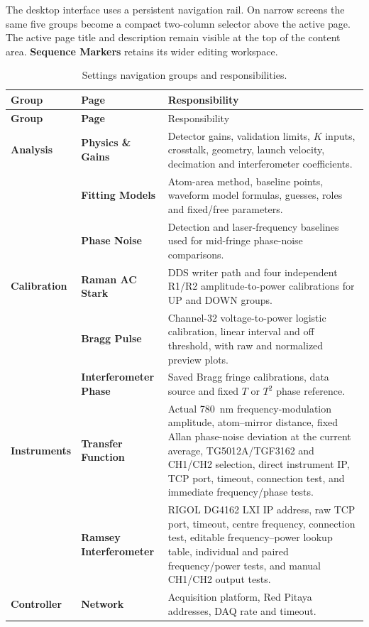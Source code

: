 \documentclass[11pt,oneside,openany]{book}
\newcommand{\ui}[1]{\textbf{#1}}
\begin{document}
The desktop interface uses a persistent navigation rail. On narrow screens the same five
groups become a compact two-column selector above the active page. The active page title
and description remain visible at the top of the content area. \ui{Sequence Markers}
retains its wider editing workspace.

\begin{longtable}{>{\raggedright\arraybackslash\bfseries}p{}
  >{\raggedright\arraybackslash\bfseries}p{}
  >{\raggedright\arraybackslash}p{}}
\caption{Settings navigation groups and responsibilities.}\label{tab:settings}\\
\toprule
Group & Page & Responsibility\\
\midrule
\endfirsthead
\toprule Group & Page & Responsibility\\ \midrule
\endhead
Analysis & Physics \& Gains & Detector gains, validation limits, $K$ inputs, crosstalk, geometry,
launch velocity, decimation and interferometer coefficients.\\
& Fitting Models & Atom-area method, baseline points, waveform model formulas, guesses,
roles and fixed/free parameters.\\
& Phase Noise & Detection and laser-frequency baselines used for mid-fringe phase-noise
comparisons.\\
\midrule
Calibration & Raman AC Stark & DDS writer path and four independent R1/R2 amplitude-to-power
calibrations for UP and DOWN groups.\\
& Bragg Pulse & Channel-32 voltage-to-power logistic calibration, linear interval and off
threshold, with raw and normalized preview plots.\\
& Interferometer Phase & Saved Bragg fringe calibrations, data source and fixed $T$ or
$T^2$ phase reference.\\
\midrule
Instruments & Transfer Function & Actual \SI{780}{\nano\meter} frequency-modulation amplitude,
atom--mirror distance, fixed Allan phase-noise deviation at the current average,
TG5012A/TGF3162 and CH1/CH2 selection, direct instrument IP, TCP port, timeout,
connection test, and immediate frequency/phase tests.\\
& Ramsey Interferometer & RIGOL DG4162 LXI IP address, raw TCP port, timeout, centre frequency,
connection test, editable frequency--power lookup table, individual and paired
frequency/power tests, and manual CH1/CH2 output tests.\\
\midrule
Controller & Network & Acquisition platform, Red Pitaya addresses, DAQ rate and timeout.\\

\end{longtable}
\end{document}
